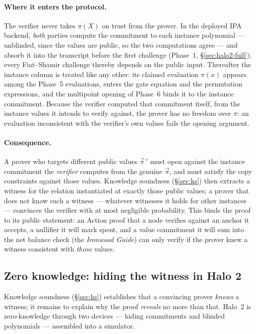 \documentclass[11pt,a4paper]{article}
\theoremstyle{definition}
\begin{document}
\paragraph{Where it enters the protocol.}
The verifier never takes $\pi(X)$ on trust from the prover. In the
deployed IPA backend, \emph{both} parties compute the commitment to each
instance polynomial --- unblinded, since the values are public, so the
two computations agree --- and absorb it into the transcript before the
first challenge (Phase~1, \S\ref{sec:halo2-full}); every Fiat--Shamir
challenge thereby depends on the public input. Thereafter the instance
column is treated like any other: its claimed evaluation $\pi(x)$ appears
among the Phase~5 evaluations, enters the gate equation and the
permutation expressions, and the multipoint opening of Phase~6 binds it
to the instance commitment. Because the verifier computed that commitment
itself, from the instance values it intends to verify against, the prover
has no freedom over $\pi$: an evaluation inconsistent with the verifier's
own values fails the opening argument.

\paragraph{Consequence.}
A prover who targets different public values $\vec{\pi}\,'$ must open
against the instance commitment the \emph{verifier} computes from the
genuine $\vec{\pi}$, and must satisfy the copy constraints against those
values. Knowledge soundness
(\S\ref{sec:ks}) then extracts a witness for the relation instantiated at
exactly those public values; a prover that does not know such a witness
--- whatever witnesses it holds for other instances --- convinces the
verifier with at most negligible probability. This binds the proof to its public
statement: an Action proof that a node verifies against an anchor it accepts,
a nullifier it will mark spent, and a value commitment it will sum into
the net balance check (the \emph{Ironwood Guide}) can only verify if the
prover knew a witness consistent with \emph{those} values.

\subsection{Zero knowledge: hiding the witness in Halo 2}\label{sec:halo-zk}

Knowledge soundness (\S\ref{sec:ks}) establishes that a convincing prover \emph{knows} a
witness; it remains to explain why the proof \emph{reveals} no more than that. Halo~2 is
zero-knowledge through two devices --- hiding commitments and blinded polynomials
--- assembled into a simulator.
\end{document}
